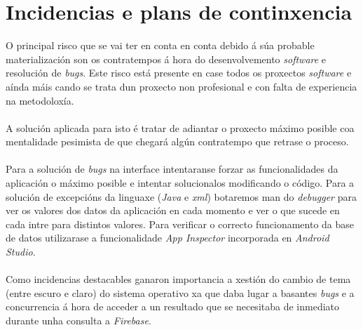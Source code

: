 \section{Incidencias e plans de continxencia}
O principal risco que se vai ter en conta en conta debido á súa probable materialización son os contratempos á hora do desenvolvemento \textit{software} e resolución de \textit{bugs}. Este risco está presente en case todos os proxectos \textit{software} e aínda máis cando se trata dun proxecto non profesional e con falta de experiencia na metodoloxía.\\
\\
A solución aplicada para isto é tratar de adiantar o proxecto máximo posible coa mentalidade pesimista de que chegará algún contratempo que retrase o proceso.\\
\\
Para a solución de \textit{bugs} na interface intentaranse forzar as funcionalidades da aplicación o máximo posible e intentar solucionalos modificando o código. Para a solución de excepcións da linguaxe (\textit{Java} e \textit{xml}) botaremos man do \textit{debugger} para ver os valores dos datos da aplicación en cada momento e ver o que sucede en cada intre para distintos valores. Para verificar o correcto funcionamento da base de datos utilizarase a funcionalidade \textit{App Inspector} incorporada en \textit{Android Studio}.\\
\\
Como incidencias destacables ganaron importancia a xestión do cambio de tema (entre escuro e claro) do sistema operativo xa que daba lugar a basantes \textit{bugs} e a concurrencia á hora de acceder a un resultado que se necesitaba de inmediato durante unha consulta a \textit{Firebase}.

 \let\cleardoublepage=\clearpage 
